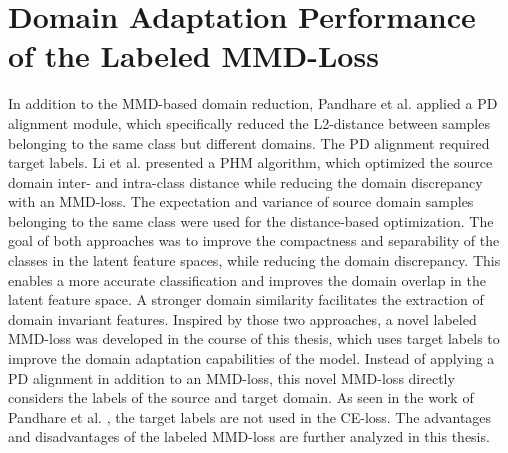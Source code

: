 \section{Domain Adaptation Performance of the Labeled MMD-Loss}
In addition to the MMD-based domain reduction, Pandhare et al. \cite{Pandhare2021} applied a PD alignment module, which specifically reduced the L2-distance between samples belonging to the same class but different domains. The PD alignment required target labels. Li et al. \cite{Li2018} presented a PHM algorithm, which optimized the source domain inter- and intra-class distance while reducing the domain discrepancy with an MMD-loss. The expectation and variance of source domain samples belonging to the same class were used for the distance-based optimization. The goal of both approaches was to improve the compactness and separability of the classes in the latent feature spaces, while reducing the domain discrepancy. This enables a more accurate classification and improves the domain overlap in the latent feature space. A stronger domain similarity facilitates the extraction of domain invariant features. Inspired by those two approaches, a novel labeled MMD-loss was developed in the course of this thesis, which uses target labels to improve the domain adaptation capabilities of the model. Instead of applying a PD alignment in addition to an MMD-loss, this novel MMD-loss directly considers the labels of the source and target domain. As seen in the work of Pandhare et al. \cite{Pandhare2021}, the target labels are not used in the CE-loss. The advantages and disadvantages of the labeled MMD-loss are further analyzed in this thesis.

